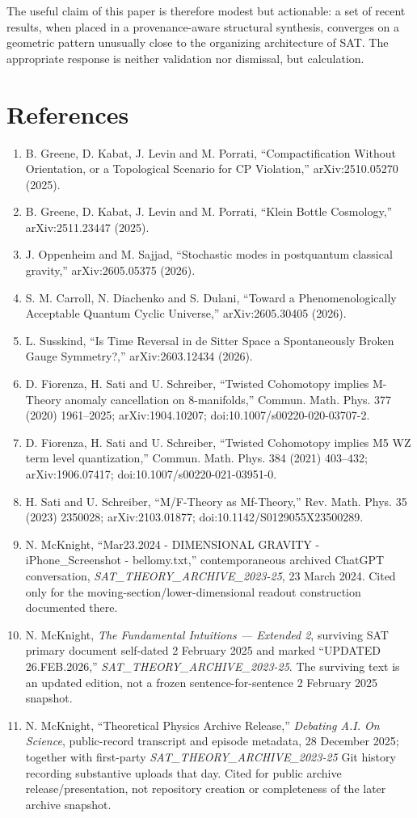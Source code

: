 \documentclass[11pt]{article}
\begin{document}
The useful claim of this paper is therefore modest but actionable: a set of recent results, when placed in a provenance-aware structural synthesis, converges on a geometric pattern unusually close to the organizing architecture of SAT. The appropriate response is neither validation nor dismissal, but calculation.

\section*{References}
\begin{enumerate}
\item B. Greene, D. Kabat, J. Levin and M. Porrati, ``Compactification Without Orientation, or a Topological Scenario for CP Violation,'' arXiv:2510.05270 (2025).
\item B. Greene, D. Kabat, J. Levin and M. Porrati, ``Klein Bottle Cosmology,'' arXiv:2511.23447 (2025).
\item J. Oppenheim and M. Sajjad, ``Stochastic modes in postquantum classical gravity,'' arXiv:2605.05375 (2026).
\item S. M. Carroll, N. Diachenko and S. Dulani, ``Toward a Phenomenologically Acceptable Quantum Cyclic Universe,'' arXiv:2605.30405 (2026).
\item L. Susskind, ``Is Time Reversal in de Sitter Space a Spontaneously Broken Gauge Symmetry?,'' arXiv:2603.12434 (2026).
\item D. Fiorenza, H. Sati and U. Schreiber, ``Twisted Cohomotopy implies M-Theory anomaly cancellation on 8-manifolds,'' Commun. Math. Phys. 377 (2020) 1961--2025; arXiv:1904.10207; doi:10.1007/s00220-020-03707-2.
\item D. Fiorenza, H. Sati and U. Schreiber, ``Twisted Cohomotopy implies M5 WZ term level quantization,'' Commun. Math. Phys. 384 (2021) 403--432; arXiv:1906.07417; doi:10.1007/s00220-021-03951-0.
\item H. Sati and U. Schreiber, ``M/F-Theory as Mf-Theory,'' Rev. Math. Phys. 35 (2023) 2350028; arXiv:2103.01877; doi:10.1142/S0129055X23500289.
\item N. McKnight, ``Mar23.2024 - DIMENSIONAL GRAVITY - iPhone\_Screenshot - bellomy.txt,'' contemporaneous archived ChatGPT conversation, \emph{SAT\_THEORY\_ARCHIVE\_2023-25}, 23 March 2024. Cited only for the moving-section/lower-dimensional readout construction documented there.
\item N. McKnight, \emph{The Fundamental Intuitions --- Extended 2}, surviving SAT primary document self-dated 2 February 2025 and marked ``UPDATED 26.FEB.2026,'' \emph{SAT\_THEORY\_ARCHIVE\_2023-25}. The surviving text is an updated edition, not a frozen sentence-for-sentence 2 February 2025 snapshot.
\item N. McKnight, ``Theoretical Physics Archive Release,'' \emph{Debating A.I. On Science}, public-record transcript and episode metadata, 28 December 2025; together with first-party \emph{SAT\_THEORY\_ARCHIVE\_2023-25} Git history recording substantive uploads that day. Cited for public archive release/presentation, not repository creation or completeness of the later archive snapshot.
\end{enumerate}
\end{document}
